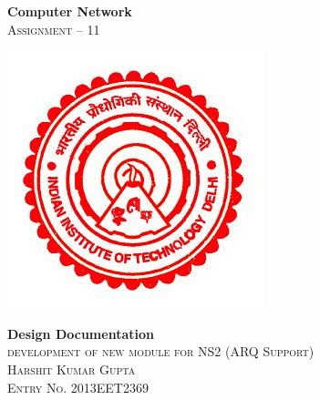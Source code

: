 \documentclass[a4paper,12pt]{article}
\begin{document}
\begin{titlepage}

\begin{center}

{ \huge \bfseries Computer Network}\\[0.8cm]


\textsc{\LARGE Assignment -- 11}\\[1.5cm]

\begin{center}
 \includegraphics{IITD.png}
\end{center}




{ \huge \bfseries Design Documentation}\\[0.4cm]
\textsc{\LARGE development of new module for NS2 (ARQ Support) }\\[1cm]
\textsc{\LARGE Harshit Kumar Gupta}\\[1.5cm]
\textsc{\LARGE Entry No. 2013EET2369}\\[0.5cm]

\end{center}

\end{titlepage}

\tableofcontents
\newpage
\end{document}
